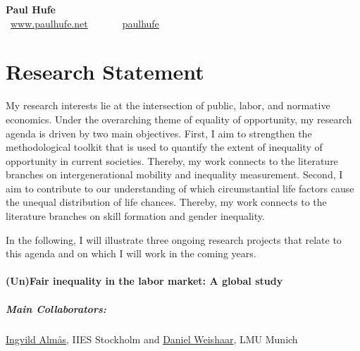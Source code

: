 \documentclass[11pt, a4paper]{article}
\begin{document}
\onehalfspacing
\setlength{\parskip}{.5cm}

\begin{center}
{\LARGE \centering \textbf{Paul Hufe}}\\
{\small \faMousePointer~\href{https://www.paulhufe.net}{www.paulhufe.net}~~~~~~\faTwitter~\href{https://twitter.com/paulhufe?lang=de}{paulhufe}}
\end{center}

\vspace{.5cm}

\section*{Research Statement}

My research interests lie at the intersection of public, labor, and normative economics. Under the overarching theme of equality of opportunity, my research agenda is driven by two main objectives. First, I aim to strengthen the methodological toolkit that is used to quantify the extent of inequality of opportunity in current societies. Thereby, my work connects to the literature branches on intergenerational mobility and inequality measurement. Second, I aim to contribute to our understanding of which circumstantial life factors cause the unequal distribution of life chances. Thereby, my work connects to the literature branches on skill formation and gender inequality.

In the following, I will illustrate three ongoing research projects that relate to this agenda and on which I will work in the coming years.

\paragraph{(Un)Fair inequality in the labor market: A global study}

\subparagraph{Main Collaborators:} \href{http://perseus.iies.su.se/~ialm/}{Ingvild Almås}, IIES Stockholm and \href{https://www.danielweishaar.net/}{Daniel Weishaar}, LMU Munich
\end{document}
